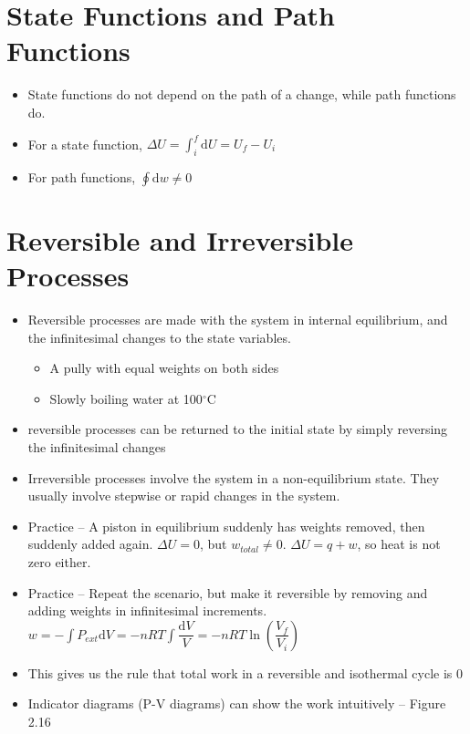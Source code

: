 \documentclass[12pt, openany, letterpaper]{memoir}
\begin{document}
\section*{State Functions and Path Functions}
\begin{itemize}
	\item State functions do not depend on the path of a change, while path functions do.
	\item For a state function, $\Delta U = \int_{i}^{f}\!\mathrm{d}U = U_f-U_i$
	\item For path functions, $\oint\! \mathrm{d}w\neq0$	
\end{itemize}
\section*{Reversible and Irreversible Processes}
\begin{itemize}
	\item Reversible processes are made with the system in internal equilibrium, and the infinitesimal changes to the state variables.
	\begin{itemize}
		\item A pully with equal weights on both sides
		\item Slowly boiling water at 100$^\circ$C
	\end{itemize}
	\item reversible processes can be returned to the initial state by simply reversing the infinitesimal changes
	\item Irreversible processes involve the system in a non-equilibrium state. They usually involve stepwise or rapid changes in the system.
	\item Practice -- A piston in equilibrium suddenly has weights removed, then suddenly added again. $\Delta U=0$, but $w_{total}\neq 0$. $\Delta U = q+w$, so heat is not zero either.
	\item Practice -- Repeat the scenario, but make it reversible by removing and adding weights in infinitesimal increments. $w=-\int\!P_{ext}\mathrm{d}V=-nRT\int\!\dfrac{\mathrm{d}V}{V}=-nRT\ln\left(\dfrac{V_f}{V_i}\right)$
	\item This gives us the rule that total work in a reversible and isothermal cycle is 0
	\item Indicator diagrams (P-V diagrams) can show the work intuitively -- Figure 2.16	
\end{itemize}
\end{document}
